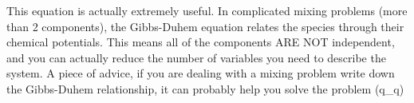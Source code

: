 \documentclass{article}
\begin{document}
This equation is actually extremely useful. 
In complicated mixing problems (more than 2 components), the Gibbs-Duhem equation relates the species through their chemical potentials. 
This means all of the components ARE NOT independent, and you can actually reduce the number of variables you need to describe the system. 
A piece of advice, if you are dealing with a mixing problem write down the Gibbs-Duhem relationship, it can probably help you solve the problem (q\_q)
\end{document}
